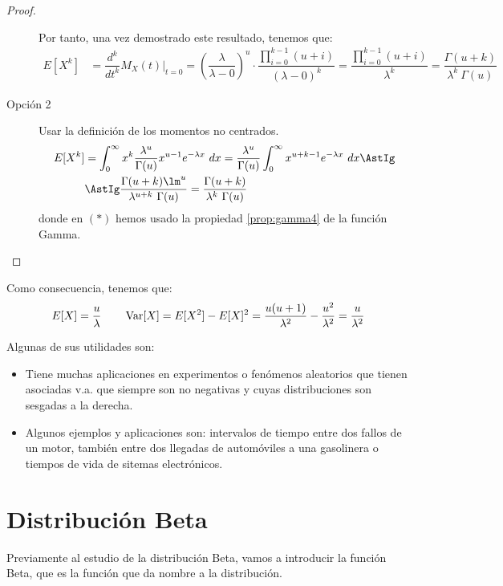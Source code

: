 \begin{proof}
\begin{description}
        Por tanto, una vez demostrado este resultado, tenemos que:
        \begin{align*}
            E[X^k] &= \dfrac{d^k}{dt^k} M_X(t) \Big|_{t=0}
            = \left(\dfrac{\lambda}{\lambda-0}\right)^u \cdot \dfrac{\prod\limits_{i=0}^{k-1}(u+i)}{(\lambda-0)^k}
            = \dfrac{\prod\limits_{i=0}^{k-1}(u+i)}{\lambda^k} = \dfrac{\Gamma(u+k)}{\lambda^k~\Gamma(u)}
        \end{align*}

        \item[Opción 2] Usar la definición de los momentos no centrados.
        \begin{align*}
            E[X^k] &= \int_{0}^{\infty} x^k \dfrac{\lambda^u}{\Gamma(u)}x^{u-1}e^{-\lambda x}~dx
            = \dfrac{\lambda^u}{\Gamma(u)} \int_{0}^{\infty} x^{u+k-1}e^{-\lambda x}~dx
            \AstIg \\ &\AstIg \dfrac{\Gamma(u+k)\lm^u}{\lambda^{u+k}~\Gamma(u)}
            = \dfrac{\Gamma(u+k)}{\lambda^k~\Gamma(u)}
        \end{align*}
        donde en $(\ast)$ hemos usado la propiedad \ref{prop:gamma4} de la función Gamma.
    \end{description}
\end{proof}

Como consecuencia, tenemos que:
\begin{equation*}
    E[X] = \dfrac{u}{\lambda} \qquad
    \operatorname{Var}[X] = E[X^2] - E[X]^2 = \dfrac{u(u+1)}{\lambda^2} - \dfrac{u^2}{\lambda^2} = \dfrac{u}{\lambda^2}
\end{equation*}


Algunas de sus utilidades son:
\begin{itemize}
    \item Tiene muchas aplicaciones en experimentos o fenómenos aleatorios que tienen asociadas v.a. que siempre son no negativas
    y cuyas distribuciones son sesgadas a la derecha.
    \item Algunos ejemplos y aplicaciones son: intervalos de tiempo entre dos fallos de un motor, también entre dos llegadas de automóviles a una gasolinera 
    o tiempos de vida de sitemas electrónicos. %
\end{itemize}


\section{Distribución Beta}

Previamente al estudio de la distribución Beta, vamos a introducir la función Beta, que es la función que da nombre a la distribución.

